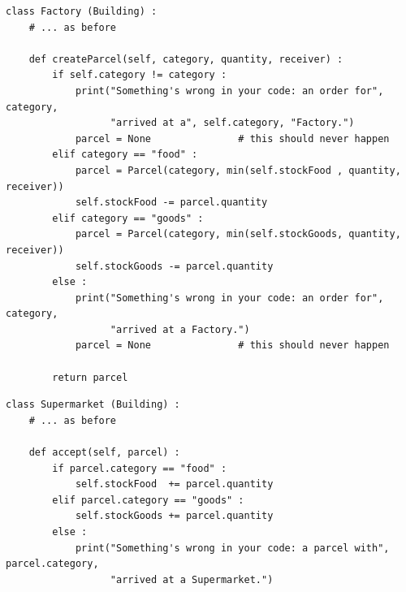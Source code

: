 
\begin{frame}[fragile]
%
\begin{codebox}
\begin{verbatim}
class Factory (Building) :
    # ... as before
    
    def createParcel(self, category, quantity, receiver) :
        if self.category != category :
            print("Something's wrong in your code: an order for", category, 
                  "arrived at a", self.category, "Factory.")
            parcel = None               # this should never happen
        elif category == "food" :
            parcel = Parcel(category, min(self.stockFood , quantity, receiver))
            self.stockFood -= parcel.quantity
        elif category == "goods" :
            parcel = Parcel(category, min(self.stockGoods, quantity, receiver))
            self.stockGoods -= parcel.quantity
        else :
            print("Something's wrong in your code: an order for", category,
                  "arrived at a Factory.")
            parcel = None               # this should never happen
        
        return parcel
\end{verbatim}
\end{codebox}
%
\end{frame}


\begin{frame}[fragile]
%
\begin{codebox}
\begin{verbatim}
class Supermarket (Building) :
    # ... as before
    
    def accept(self, parcel) :
        if parcel.category == "food" :
            self.stockFood  += parcel.quantity
        elif parcel.category == "goods" :
            self.stockGoods += parcel.quantity
        else :
            print("Something's wrong in your code: a parcel with", parcel.category,
                  "arrived at a Supermarket.")
\end{verbatim}
\end{codebox}
%
\end{frame}


